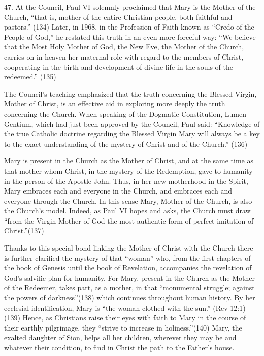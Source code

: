 \documentclass[oneside]{book}
\begin{document}
47. At the Council, Paul VI solemnly proclaimed that Mary is the Mother of the
Church, ``that is, mother of the entire Christian people, both faithful and
pastors.'' (134) Later, in 1968, in the Profession of Faith known as ``Credo of
the People of God,'' he restated this truth in an even more forceful way: ``We
believe that the Most Holy Mother of God, the New Eve, the Mother of the Church,
carries on in heaven her maternal role with regard to the members of Christ,
cooperating in the birth and development of divine life in the souls of the
redeemed.'' (135)

The Council's teaching emphasized that the truth concerning the Blessed Virgin,
Mother of Christ, is an effective aid in exploring more deeply the truth
concerning the Church. When speaking of the Dogmatic Constitution, Lumen
Gentium, which had just been approved by the Council, Paul said: ``Knowledge of
the true Catholic doctrine regarding the Blessed Virgin Mary will always be a
key to the exact understanding of the mystery of Christ and of the
Church.'' (136)

Mary is present in the Church as the Mother of Christ, and at the same time as
that mother whom Christ, in the mystery of the Redemption, gave to humanity in
the person of the Apostle John. Thus, in her new motherhood in the Spirit, Mary
embraces each and everyone in the Church, and embraces each and everyone through
the Church. In this sense Mary, Mother of the Church, is also the Church's
model. Indeed, as Paul VI hopes and asks, the Church must draw ``from the Virgin
Mother of God the most authentic form of perfect imitation of Christ.''(137)

Thanks to this special bond linking the Mother of Christ with the Church there
is further clarified the mystery of that ``woman'' who, from the first chapters
of the book of Genesis until the book of Revelation, accompanies the revelation
of God's salvific plan for humanity. For Mary, present in the Church as the
Mother of the Redeemer, takes part, as a mother, in that ``monumental struggle;
against the powers of darkness''(138) which continues throughout human
history. By her ecclesial identification, Mary is ``the woman clothed with the
sun.'' (Rev 12:1) (139) Hence, as Christians raise their eyes with faith to Mary
in the course of their earthly pilgrimage, they ``strive to increase in
holiness.''(140)  Mary, the exalted daughter of Sion, helps all her children,
wherever they may be and whatever their condition, to find in Christ the path to
the Father's house.
\end{document}
